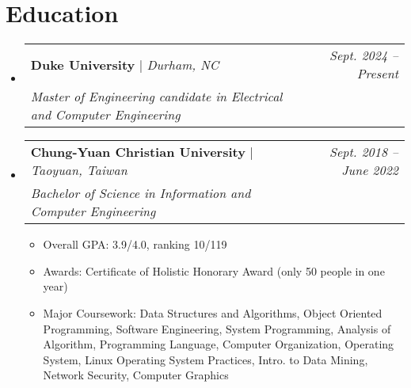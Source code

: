 \documentclass[letterpaper,11pt]{article}
\makeatletter
\newcommand{\subheadingtitlevspace}{
\vspace{-3pt}
}
\newcommand{\resumeItem}[1]{
  \item{
    {#1 \vspace{-4pt}}
  }
}
\newcommand{\resumeSubheading}[4]{
   \item
     \begin{tabular*}{0.97\textwidth}[t]{l@{\extracolsep{\fill}}r}
       \textbf{#1} | \emph{#2} & \textit{#4}\\
       \textit{#3} \\
     \end{tabular*}\vspace{-8pt}
 }
\newcommand{\resumeSubHeadingListStart}{\subheadingtitlevspace\begin{itemize}[leftmargin=0.15in, label={}]}
\newcommand{\resumeSubHeadingListEnd}{\end{itemize}}
\newcommand{\resumeItemListStart}{
\begin{itemize}}
\newcommand{\resumeItemListEnd}{
\end{itemize}\vspace{-8pt}}
\makeatother
\begin{document}


\section{Education}
  \resumeSubHeadingListStart
    \resumeSubheading
      {Duke University}{Durham, NC}
      {Master of Engineering candidate in Electrical and Computer Engineering} 
      {Sept. 2024 -- Present} %
    \resumeSubheading
      {Chung-Yuan Christian University} {Taoyuan, Taiwan}
      {Bachelor of Science in Information and Computer Engineering} 
      {Sept. 2018 -- June 2022}
    \resumeItemListStart
      \resumeItem{Overall GPA: 3.9/4.0, ranking 10/119}
      \resumeItem{Awards: Certificate of Holistic Honorary Award (only 50 people in one year)}
      \resumeItem{Major Coursework: Data Structures and Algorithms, Object Oriented Programming, Software Engineering, System Programming, 
                  Analysis of Algorithm, Programming Language, Computer Organization, Operating System, Linux Operating System Practices, 
                  Intro. to Data Mining, Network Security, Computer Graphics} 
    \resumeItemListEnd
  \resumeSubHeadingListEnd
\end{document}
